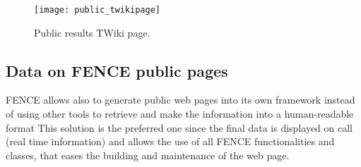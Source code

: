 \begin{figure}[htb]
  \centering
  \texttt{[image: public\_twikipage]}
  \caption{Public results TWiki page.}
  \label{fig:public_twikipage}
\end{figure}

\subsection{Data on FENCE public pages}
\label{sec:Data_on_FENCE_public_pages}

FENCE allows also to generate public web pages into its own framework instead of using other tools to retrieve and make the information into a human-readable format
This solution is the preferred one since the final data is displayed on call (real time information) and allows the use of all FENCE functionalities and classes,
that eases the building and maintenance of the web page.
